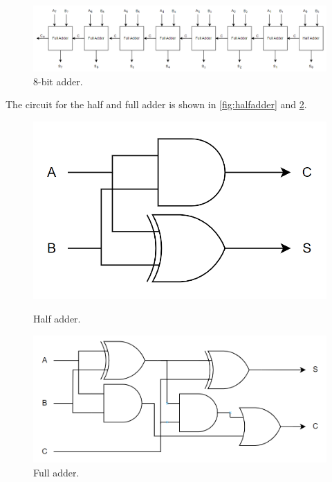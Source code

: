 \begin{figure}[H]
    \centering
    \includegraphics[width=\textwidth]{Figures/8bitadder.png}
    \caption{8-bit adder.}
    \label{fig:adder-blokk}
\end{figure}

The circuit for the half and full adder is shown in \autoref{fig:halfadder} and \ref{fig:fulladder}. 

\begin{figure}[H]
\begin{minipage}{0.4\textwidth}
    \centering
    \includegraphics[width=\linewidth]{Figures/halfadder.png}
    \caption{Half adder.}
    \label{fig:halfadder}
\end{minipage}
\begin{minipage}{0.6\textwidth}
    \centering
    \includegraphics[width=\linewidth]{Figures/fulladder.png}
    \caption{Full adder.}
    \label{fig:fulladder}
\end{minipage}
\end{figure}


